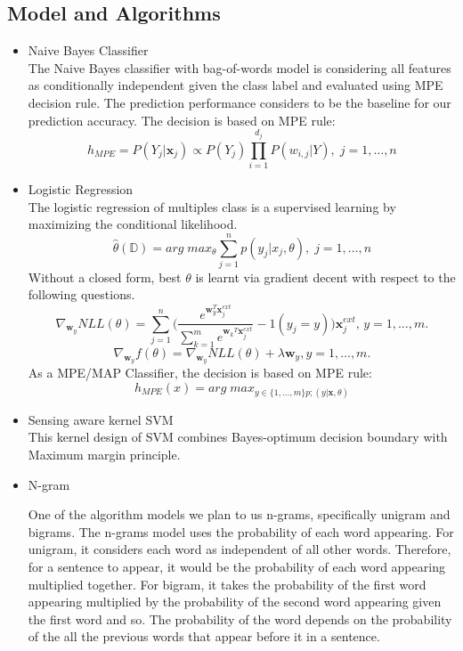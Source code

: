 \documentclass[a4paper, 11pt]{article}
\begin{document}
\subsection{Model and Algorithms}
\begin{itemize}
	\item Naive Bayes Classifier\\
	The Naive Bayes classifier with bag-of-words model is considering all features as conditionally independent given the class label and evaluated using MPE decision rule.\cite{ishwarspring18} The prediction performance considers to be the baseline for our prediction accuracy. 
	The decision is based on MPE rule:
	\[h_{MPE} = P(Y_j|\pmb{x}_j) \propto P(Y_j)\prod^{d_j}_{i=1}P(w_{i,j}|Y), \;j = 1,\ldots,n\]
	\item Logistic Regression \\
	The logistic regression of multiples class is a supervised learning by maximizing the conditional likelihood.
	\[\hat{\theta}(\mathbb{D}) = arg \; max_\theta \sum_{j=1}^{n}p(y_j|x_j,\theta), \;j = 1,\ldots,n\]Without a closed form, best $\theta$ is learnt via gradient decent with respect to the following questions. 
	\[\nabla_{\pmb{w}_y}NLL(\theta) = \sum_{j=1}^{n}\bigg(\frac{e^{\pmb{w}_y^T\pmb{x}_j^{ext}}}{\sum_{k=1}^{m}e^{{\pmb{w}_k}^T\pmb{x}_j^{ext}}}-1(y_j = y)\bigg)\pmb{x}^{ext}_{j},\,y=1,\ldots,m.\]
	\[\nabla_{\pmb{w}_y}f(\theta) = \nabla_{\pmb{w}_y}NLL(\theta)+\lambda\pmb{w}_{y},y=1,\ldots,m.\]
	As a MPE/MAP Classifier, the decision is based on MPE rule:\[h_{MPE}(x) = arg \; max_{y \in\{1,\ldots,m\}p;(y|\pmb{x},\theta)}\]
	\item Sensing aware kernel SVM\\
	This kernel design of SVM combines Bayes-optimum decision boundary with Maximum margin principle. \cite{ding2014sensing}
	\item N-gram
	\par One of the algorithm models we plan to us n-grams, specifically unigram and bigrams.  The n-grams model uses the probability of each word appearing. For unigram, it considers each word as independent of all other words. Therefore, for a sentence to appear, it would be the probability of each word appearing multiplied together. For bigram, it takes the probability of the first word appearing multiplied by the probability of the second word appearing given the first word and so. The probability of the word depends on the probability of the all the previous words that appear before it in a sentence. \cite{song1999general} \\

\end{itemize}
\end{document}
